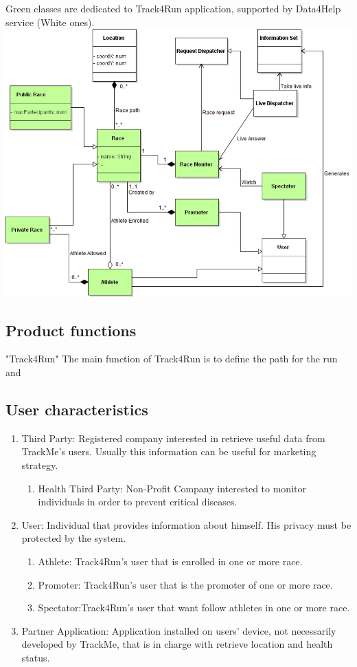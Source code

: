 \begin{center}
{\color{LimeGreen} Green classes} are dedicated to {\color{LimeGreen} Track4Run} application, supported by Data4Help service (White ones).
\includegraphics[scale=0.5]{Images/Class_Track4Run.png}
\end{center}


\subsection{Product functions}
"Track4Run"
The main function of Track4Run is to define the path for the run and

\subsection{User characteristics}
\begin{enumerate}
\item Third Party: Registered company interested in retrieve useful data from TrackMe's users. Usually this information can be useful for marketing strategy.
	\begin{enumerate}
		\item Health Third Party: Non-Profit Company interested to monitor 		individuals in order to prevent critical diseases. 
	\end{enumerate}
\item User: Individual that provides information about himself. His privacy must be protected by the system.
	\begin{enumerate}
		\item Athlete: Track4Run's user that is enrolled in one or more race.
		\item Promoter: Track4Run's user that is the promoter of one or more race.
		\item Spectator:Track4Run's user that want follow athletes in one or more race.
	\end{enumerate}
\item Partner Application: Application installed on users' device, not necessarily developed by TrackMe, that is in charge with retrieve location and health status.
\end{enumerate}

